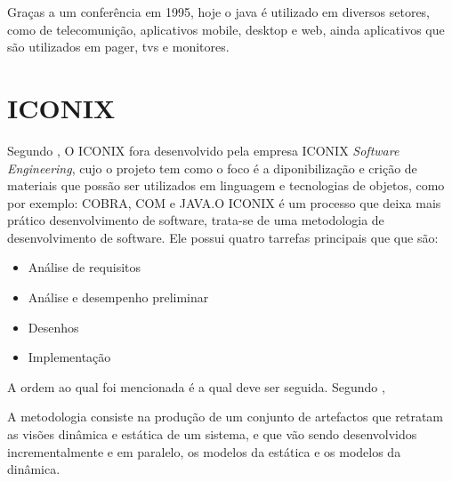 \par Graças a um conferência em 1995, hoje o java é utilizado em diversos
setores, como de telecomunição, aplicativos mobile, desktop e web, ainda
aplicativos que são utilizados em pager, tvs e monitores.




\section{ICONIX}

\par  Segundo , O ICONIX fora desenvolvido pela
empresa ICONIX \textit{Software Engineering}, cujo o projeto tem como o foco é a
diponibilização e crição de materiais que possão ser utilizados em linguagem e
tecnologias de objetos, como por exemplo: COBRA, COM e JAVA.O ICONIX é um
processo que deixa mais prático  desenvolvimento de software, trata-se de uma metodologia de
desenvolvimento de software. Ele possui quatro tarrefas principais que que são:

\begin{itemize}
  \item Análise de requisitos
  \item Análise e desempenho preliminar
  \item Desenhos
  \item Implementação
\end{itemize}

\par A ordem ao qual foi mencionada é a qual
deve ser seguida. Segundo ,

\begin{citacao}
	A metodologia consiste na produção de um conjunto de artefactos que
    retratam as visões dinâmica e estática de um sistema, e que vão sendo
 	desenvolvidos incrementalmente e em paralelo, os modelos da estática
	e os modelos da dinâmica.
\end{citacao}






